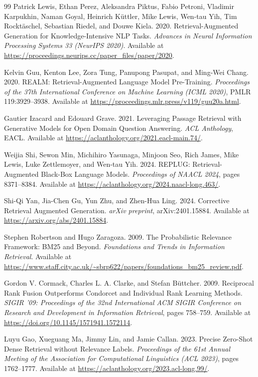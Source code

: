 \documentclass[10pt]{article}
\begin{document}
\begin{thebibliography}{99}
Patrick Lewis, Ethan Perez, Aleksandra Piktus, Fabio Petroni, Vladimir Karpukhin, Naman Goyal, Heinrich K\"uttler, Mike Lewis, Wen-tau Yih, Tim Rockt\"aschel, Sebastian Riedel, and Douwe Kiela. 2020. Retrieval-Augmented Generation for Knowledge-Intensive NLP Tasks. \emph{Advances in Neural Information Processing Systems 33 (NeurIPS 2020)}. Available at \url{https://proceedings.neurips.cc/paper_files/paper/2020}.

Kelvin Guu, Kenton Lee, Zora Tung, Panupong Pasupat, and Ming-Wei Chang. 2020. REALM: Retrieval-Augmented Language Model Pre-Training. \emph{Proceedings of the 37th International Conference on Machine Learning (ICML 2020)}, PMLR 119:3929--3938. Available at \url{https://proceedings.mlr.press/v119/guu20a.html}.

Gautier Izacard and Edouard Grave. 2021. Leveraging Passage Retrieval with Generative Models for Open Domain Question Answering. \emph{ACL Anthology}, EACL. Available at \url{https://aclanthology.org/2021.eacl-main.74/}.

Weijia Shi, Sewon Min, Michihiro Yasunaga, Minjoon Seo, Rich James, Mike Lewis, Luke Zettlemoyer, and Wen-tau Yih. 2024. REPLUG: Retrieval-Augmented Black-Box Language Models. \emph{Proceedings of NAACL 2024}, pages 8371--8384. Available at \url{https://aclanthology.org/2024.naacl-long.463/}.

Shi-Qi Yan, Jia-Chen Gu, Yun Zhu, and Zhen-Hua Ling. 2024. Corrective Retrieval Augmented Generation. \emph{arXiv preprint}, arXiv:2401.15884. Available at \url{https://arxiv.org/abs/2401.15884}.

Stephen Robertson and Hugo Zaragoza. 2009. The Probabilistic Relevance Framework: BM25 and Beyond. \emph{Foundations and Trends in Information Retrieval}. Available at \url{https://www.staff.city.ac.uk/~sbrp622/papers/foundations_bm25_review.pdf}.

Gordon V. Cormack, Charles L. A. Clarke, and Stefan B\"uttcher. 2009. Reciprocal Rank Fusion Outperforms Condorcet and Individual Rank Learning Methods. \emph{SIGIR '09: Proceedings of the 32nd International ACM SIGIR Conference on Research and Development in Information Retrieval}, pages 758--759. Available at \url{https://doi.org/10.1145/1571941.1572114}.

Luyu Gao, Xueguang Ma, Jimmy Lin, and Jamie Callan. 2023. Precise Zero-Shot Dense Retrieval without Relevance Labels. \emph{Proceedings of the 61st Annual Meeting of the Association for Computational Linguistics (ACL 2023)}, pages 1762--1777. Available at \url{https://aclanthology.org/2023.acl-long.99/}.

\end{thebibliography}
\end{document}
